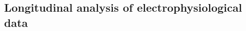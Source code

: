 \documentclass[journal]{IEEEtran}
\begin{document}
\subsection{Longitudinal analysis of electrophysiological data\label{sec:forensics}}




\begin{figure}[!htbp]
\centering

\end{figure}
\end{document}
